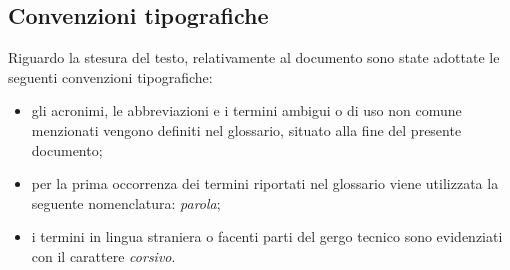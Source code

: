 \subsection{Convenzioni tipografiche}

Riguardo la stesura del testo, relativamente al documento sono state adottate le seguenti convenzioni tipografiche:
\begin{itemize}
	\item gli acronimi, le abbreviazioni e i termini ambigui o di uso non comune menzionati vengono definiti nel glossario, situato alla fine del presente documento;
	\item per la prima occorrenza dei termini riportati nel glossario viene utilizzata la seguente nomenclatura: \emph{parola}\glsfirstoccur;
	\item i termini in lingua straniera o facenti parti del gergo tecnico sono evidenziati con il carattere \emph{corsivo}.
\end{itemize}
